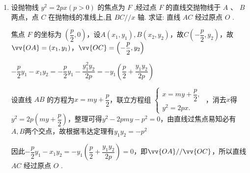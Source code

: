 \begin{enumerate}
\begin{enumerate}
\begin{jieda}
\begin{enumerate}
                因为${MA}\bot {MB}$，所以$\vv{MA} \cdot  \vv{MB} = 0$，即$\left( {{x}_{1} + 2}\right) \left( {{x}_{2} + 2}\right)  + \left( {{y}_{1} - 1}\right) \left( {{y}_{2} - 1}\right)  = 0$ ,

                根据直线方程和联立结果可得$ - 4 + {8k} + 4 - 4{k}^{2} = 0$ ,解得 $k = 2$ 或 $k = 0$ .

            \end{enumerate}
        \end{jieda}
        \item 设抛物线 ${y}^{2} = {2px}\left( {p > 0}\right)$ 的焦点为 ${F}$ ,经过点 ${F}$ 的直线交抛物线于 ${A}$ 、 ${B}$ 两点，点 ${C}$ 在抛物线的准线上,且 ${{BC}}//x$ 轴. 求证: 直线 ${{AC}}$ 经过原点 ${O}$ .
        \begin{jieda}
            焦点 $F$ 的坐标为 $\left( {\dfrac{p}{2},0}\right)$，设$A(x_1, y_1), B(x_2, y_2)$，故$C\left(-\dfrac{p}{2}, y_2\right)$，故$\vv{OA} = (x_1, y_1)$，$\vv{OC} = \left(-\dfrac{p}{2}, y_2\right)$
            
            $-\dfrac{p}{2}y_1 - x_1y_2 = -\dfrac{p}{2}y_1 - \dfrac{y_1^2y_2}{2p} = -y_1\left(\dfrac{p}{2}+\dfrac{y_1y_2}{2p}\right)$
            
            设直线 ${AB}$ 的方程为$x = my+\dfrac{p}{2}$，联立方程组 $\left\{  \begin{array}{l} 
                x = my+\dfrac{p}{2}, \\  
                {y}^{2} = {2px}. \end{array}\right.$ ，消去$x$得 ${y}^{2} = 2p\left(my+\dfrac{p}{2}\right)$，整理可得$y^2 - 2pmy - p^2 = 0$，由直线过焦点易知必有$A, B$两个交点，故根据韦达定理有${y}_{1}{y}_{2} =  - {p}^{2}$
                
                因此$-\dfrac{p}{2}y_1 - x_1y_2 = -y_1\left(\dfrac{p}{2}+\dfrac{y_1y_2}{2p}\right) = 0$，即$\vv{OA} // \vv{OC}$，所以直线 ${{AC}}$ 经过原点 ${O}$ .
        \end{jieda}
    \end{enumerate}


\end{enumerate}
